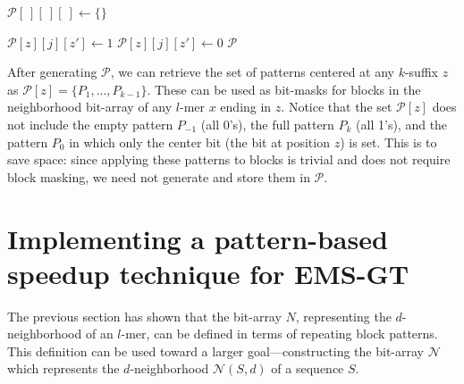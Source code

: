 \documentclass[oneside,12pt]{DISCSthesis}
\begin{document}
{\begin{enumerate}
{\begin{algorithmic}[1]
				\State $\mathcal{P}[\ ][\ ][\ ] \leftarrow \{\}$ \hspace*{90pt}

					\State $\mathcal{P}[z][j][z'] \leftarrow 1$
				\Else
					\State $\mathcal{P}[z][j][z'] \leftarrow 0$
				\EndIf\EndFor\EndFor\EndFor
				\State\Return $\mathcal{P}$
				\end{algorithmic}
			}
			\bigskip
			\noindent After generating $\mathcal{P}$, we can retrieve the set of patterns centered at any $k$-suffix $z$ as $\mathcal{P}[z] = \{P_{1},...,P_{k-1}\}$. These can be used as bit-masks for blocks in the neighborhood bit-array of any $l$-mer $x$ ending in $z$. Notice that the set $\mathcal{P}[z]$ does not include the empty pattern $P_{-1}$ (all 0's), the full pattern $P_{k}$ (all 1's), and the pattern $P_{0}$ in which only the center bit (the bit at position $z$) is set. This is to save space: since applying these patterns to blocks is trivial and does not require block masking, we need not generate and store them in $\mathcal{P}$.
		\end{enumerate}

	\newpage
	\section{Implementing a pattern-based speedup technique for EMS-GT}
		The previous section has shown that the bit-array $N$, representing the $d$-neighborhood of an $l$-mer, can be defined in terms of repeating block patterns. This definition can be used toward a larger goal---constructing the bit-array $\mathcal{N}$ which represents the $d$-neighborhood $\mathcal{N}(S,d)$ of a sequence $S$.

}
\end{document}
